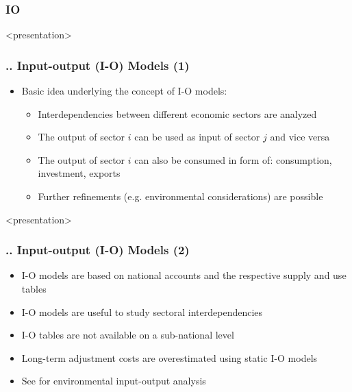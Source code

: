 \documentclass[11pt,aspectratio=169]{beamer}
\begin{document}
\subsubsection{IO}
\begin{frame}<presentation>
	\frametitle{{\thesection.\thesubsection.\thesubsubsection} Input-output (I-O) Models (1)}	
	\begin{itemize}
		\item Basic idea underlying the concept of I-O models: 
		\begin{itemize}
			\item Interdependencies between different economic sectors are analyzed
			\item The output of sector $i$ can be used as input of sector $j$ and vice versa
			\item The output of sector $i$ can also be consumed in form of: consumption, investment, exports 
			\item Further refinements (e.g. environmental considerations) are possible
		\end{itemize}
	\end{itemize}	
\end{frame}
\begin{frame}<presentation>
	\frametitle{{\thesection.\thesubsection.\thesubsubsection} Input-output (I-O) Models (2)}	
	\begin{itemize}		
	\item I-O models are based on national accounts and the respective supply and use tables	
	\item I-O models are useful to study sectoral interdependencies
	\item I-O tables are not available on a sub-national level
	\item Long-term adjustment costs are overestimated using static I-O models
	\item See \cite{miller2009input} for environmental input-output analysis
	\end{itemize}	
\end{frame}
\end{document}
